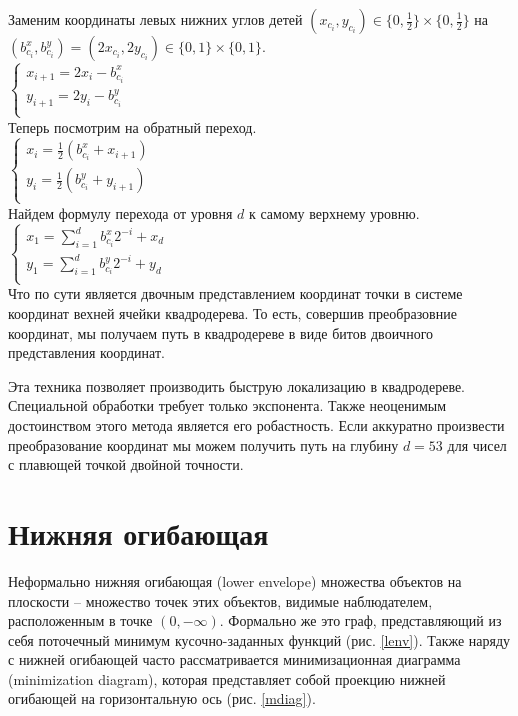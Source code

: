 Заменим координаты левых нижних углов детей $(x_{c_i}, y_{c_i}) \in \{0, \frac{1}{2}\} \times \{0, \frac{1}{2}\}$
на $(b^x_{c_i}, b^y_{c_i}) = (2x_{c_i}, 2y_{c_i}) \in \{0, 1\} \times \{0, 1\}$.\\
$
\left\{
\begin{array}{l}
x_{i+1} = 2x_i - b^x_{c_i}  \\
y_{i+1} = 2y_i - b^y_{c_i}  \\
\end{array}
\right.$
\\
Теперь посмотрим на обратный переход.\\
$
\left\{
\begin{array}{l}
x_i = \frac{1}{2}(b^x_{c_i} + x_{i+1})  \\
y_i = \frac{1}{2}(b^y_{c_i} + y_{i+1})  \\
\end{array}
\right.$
\\
Найдем формулу перехода от уровня $d$ к самому верхнему уровню.\\
$
\left\{
\begin{array}{l}
x_1 = \sum\limits_{i=1}^db^x_{c_i}2^{-i} + x_d  \\
y_1 = \sum\limits_{i=1}^db^y_{c_i}2^{-i} + y_d  \\
\end{array}
\right.$
\\
Что по сути является двочным представлением координат точки в системе координат вехней ячейки квадродерева.
То есть, совершив преобразовние координат, мы получаем путь в квадродереве в виде битов
двоичного представления координат.

Эта техника позволяет производить быструю локализацию в квадродереве. 
Специальной обработки требует только экспонента. Также неоценимым достоинством этого метода
является его робастность. Если аккуратно произвести преобразование координат мы можем
получить путь на глубину $d = 53$ для чисел с плавющей точкой двойной точности.



\section{Нижняя огибающая}
Неформально нижняя огибающая (lower envelope) множества объектов на плоскости –
множество точек этих объектов, видимые наблюдателем, расположенным в
точке $(0, -\infty)$. Формально же это граф, представляющий из себя поточечный
минимум кусочно-заданных функций \cite{LENV} (рис. \ref{lenv}).
Также наряду с нижней огибающей часто рассматривается минимизационная диаграмма
(minimization diagram), которая представляет собой проекцию нижней огибающей на
горизонтальную ось (рис. \ref{mdiag}). 

